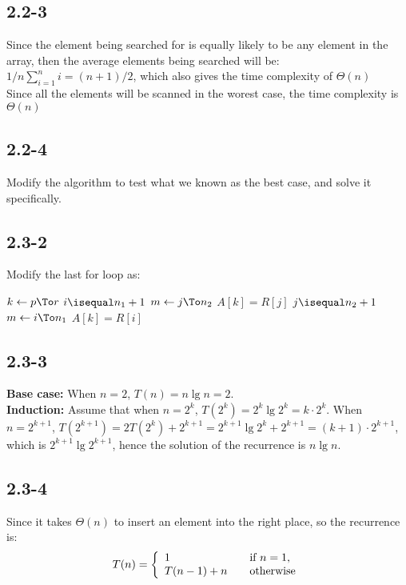 \documentclass[a4paper, 11pt]{report}
\begin{document}
				\subsection{2.2-3}
					Since the element being searched for is equally likely to be any element in the array, then the average elements being searched
					will be: $1/n\sum_{i=1}^n i=(n+1)/2$, which also gives the time complexity of $\Theta(n)$	\\
					Since all the elements will be scanned in the worest case, the time complexity is $\Theta(n)$
				\subsection{2.2-4}
					Modify the algorithm to test what we known as the best case, and solve it specifically.
				\subsection{2.3-2}
					Modify the last for loop as:
					\begin{codebox}
					\li	\For $k \gets p \To r$
						\Do
					\li		\If $i \isequal n_1+1$
							\Then
					\li			\For $m \gets j \To n_2$
								\Do
					\li				$A[k] = R[j]$	
								\End
					\li			{}
							\End
					\li		\If $j \isequal n_2+1$
							\Then
					\li			\For $m \gets i \To n_1$
								\Do
					\li				$A[k] = R[i]$	
								\End
					\li			{}
							\End
						\End
					\end{codebox}
				\subsection{2.3-3}
					\textbf{Base case:} When $n=2$, $T(n)=n \lg n=2$. \\
					\textbf{Induction:} Assume that when $n=2^k$, $T(2^k)=2^k \lg 2^k=k\cdot2^k$. When $n=2^{k+1}$, 
					$T(2^{k+1})=2T(2^k)+2^{k+1}=2^{k+1} \lg 2^k + 2^{k+1}=(k+1)\cdot 2^{k+1}$, which is $2^{k+1}\lg 2^{k+1}$,
					hence the solution of the recurrence is $n\lg n$.
				\subsection{2.3-4}
					Since it takes $\Theta(n)$ to insert an element into the right place, so the recurrence is:
					\begin{displaymath}
						T(n) = \left\{
						\begin{array}{l l}
							1	& \quad \text{if $n=1$,}\\
							T(n-1) + n & \quad \text{otherwise}
						\end{array}
						\right.
					\end{displaymath}
\end{document}

